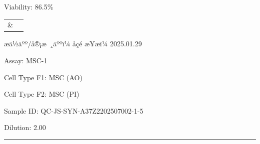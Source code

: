 \documentclass[UTF8,10pt,a4paper,fontset=fandol]{ctexart}
\newcommand{\fieldvalue}[1]{#1}
\newcommand{\handwritten}[1]{#1}
\begin{document}
\begin{center}
\begin{center}
\medskip
\noindent
\fieldvalue{Viability: 86.5\%}

\medskip
\begin{center}
\begin{tabular}{cc}
\parbox[c][0.22\textheight][c]{0.43\textwidth}{%
\centering
}
&
\parbox[c][0.22\textheight][c]{0.43\textwidth}{%
\centering
}
\\[1em]
\parbox[c][0.22\textheight][c]{0.43\textwidth}{%
\centering
}
&
\parbox[c][0.22\textheight][c]{0.43\textwidth}{%
\centering
}
\end{tabular}
\end{center}

\vfill

\noindent æä½äºº/å®¡æ ¸äººï¼
\fieldvalue{\handwritten{åçé}}
\hfill
æ¥æï¼
\fieldvalue{\handwritten{2025.01.29}}

\newpage

Assay:
\fieldvalue{MSC-1}

Cell Type F1:
\fieldvalue{MSC (AO)}

Cell Type F2:
\fieldvalue{MSC (PI)}

Sample ID:
\fieldvalue{QC-JS-SYN-A37Z2202507002-1-5}

Dilution:
\fieldvalue{2.00}

\noindent\rule{\textwidth}{0.4pt}


\end{center}
\end{center}
\end{document}

